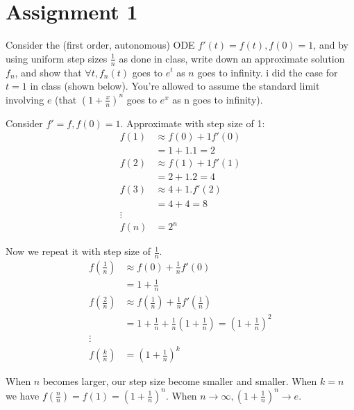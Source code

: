\section{Assignment 1}

\begin{questions}

\question[5]
Consider the (first order, autonomous) ODE $f'(t)=f(t), f(0)=1$, and by using
uniform step sizes $\frac{1}{n}$ as done in class, write down an approximate
solution $f_n$, and show that $\forall t, f_n(t)$ goes to $e^t$ as $n$ goes to
infinity.  i did the case for $t=1$ in class (shown below). You're allowed to
assume the standard limit involving $e$ (that $\left( 1+\frac{x}{n}\right)^n$
goes to $e^x$ as n goes to infinity).



\begin{solution}
Consider $f' = f, f(0) = 1$. Approximate with step size of 1:
\begin{align}
f(1) &\approx f(0) + 1 f'(0) \\
     &= 1 + 1.1 = 2 \\
f(2) &\approx f(1) + 1f'(1) \\
     &= 2 + 1.2 = 4 \\
f(3) &\approx 4 + 1. f'(2) \\
	 &= 4 + 4 = 8 \\
     \vdots \\
f(n) &= 2^n  
\end{align}

Now we repeat it with step size of $\frac{1}{n}$.
\begin{align}
f(\frac{1}{n}) &\approx f(0) + \frac{1}{n} f'(0) \\
     &= 1 + \frac{1}{n} \\
f(\frac{2}{n}) &\approx f(\frac{1}{n}) + \frac{1}{n}f'(\frac{1}{n}) \\
     &= 1 + \frac{1}{n} + \frac{1}{n} \left( 1 + \frac{1}{n} \right) 
     	= \left( 1 + \frac{1}{n} \right) ^ 2\\
        \vdots \\
f(\frac{k}{n}) &= \left( 1 + \frac{1}{n} \right) ^k  
\end{align}

When $n$ becomes larger, our step size become smaller and smaller. When $k = n$
we have $f(\frac{n}{n}) = f(1) = \left( 1 + \frac{1}{n} \right)^n $. When $n
\rightarrow \infty, \left( 1 + \frac{1}{n} \right)^n \rightarrow e$.
\end{solution}


\end{questions}
